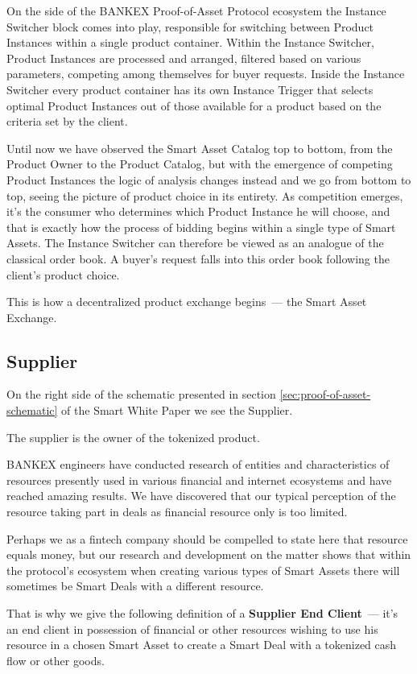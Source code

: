 \documentclass{article}
\begin{document}
\begin{multicols}{2}
On the side of the BANKEX Proof-of-Asset Protocol ecosystem the Instance Switcher block comes into play, responsible for switching between Product Instances within a single product container. Within the Instance Switcher, Product Instances are processed and arranged, filtered based on various parameters, competing among themselves for buyer requests. Inside the Instance Switcher every product container has its own Instance Trigger that selects optimal Product Instances out of those available for a product based on the criteria set by the client.

Until now we have observed the Smart Asset Catalog top to bottom, from the Product Owner to the Product Catalog, but with the emergence of competing Product Instances the logic of analysis changes instead and we go from bottom to top, seeing the picture of product choice in its entirety. As competition emerges, it's the consumer who determines which Product Instance he will choose, and that is exactly how the process of bidding begins within a single type of Smart Assets. The Instance Switcher can therefore be viewed as an analogue of the classical order book. A buyer's request falls into this order book following the client’s product choice.

This is how a decentralized product exchange begins~--- the Smart Asset Exchange.

\subsection{Supplier}

On the right side of the schematic presented in section \ref{sec:proof-of-asset-schematic} of the Smart White Paper we see the Supplier.
	
The supplier is the owner of the tokenized product.

BANKEX engineers have conducted research of entities and characteristics of resources presently used in various financial and internet ecosystems and have reached amazing results. We have discovered that our typical perception of the resource taking part in deals as financial resource only is too limited.

Perhaps we as a fintech company should be compelled to state here that resource equals money, but our research and development on the matter shows that within the protocol’s ecosystem when creating various types of Smart Assets there will sometimes be Smart Deals with a different resource.

That is why we give the following definition of a \textbf{Supplier End Client}~--- it’s an end client in possession of financial or other resources wishing to use his resource in a chosen Smart Asset to create a Smart Deal with a tokenized cash flow or other goods.


\end{multicols}
\end{document}
